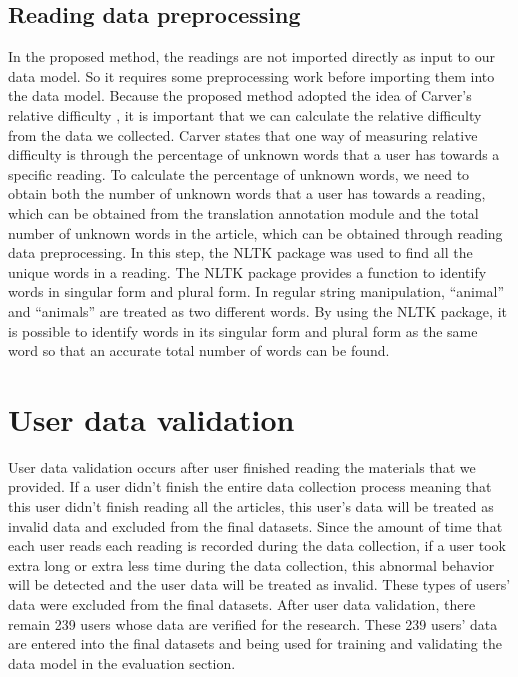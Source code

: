 \subsection{Reading data preprocessing}
\vspace{10pt}
In the proposed method, the readings are not imported directly as input to our data model. So it requires some preprocessing work before importing them into the data model. Because the proposed method adopted the idea of Carver's relative difficulty \cite{Carver1994}, it is important that we can calculate the relative difficulty from the data we collected. Carver states that one way of measuring relative difficulty is through the percentage of unknown words that a user has towards a specific reading. To calculate the percentage of unknown words, we need to obtain both the number of unknown words that a user has towards a reading, which can be obtained from the translation annotation module and the total number of unknown words in the article, which can be obtained through reading data preprocessing. In this step, the NLTK package was used to find all the unique words in a reading. The NLTK package provides a function to identify words in singular form and plural form. In regular string manipulation, “animal” and “animals” are treated as two different words. By using the NLTK package, it is possible to identify words in its singular form and plural form as the same word so that an accurate total number of words can be found.

\section{User data validation}
User data validation occurs after user finished reading the materials that we provided. If a user didn't finish the entire data collection process meaning that this user didn't finish reading all the articles, this user's data will be treated as invalid data and excluded from the final datasets. Since the amount of time that each user reads each reading is recorded during the data collection, if a user took extra long or extra less time during the data collection, this abnormal behavior will be detected and the user data will be treated as invalid. These types of users' data were excluded from the final datasets. After user data validation, there remain 239 users whose data are verified for the research. These 239 users' data are entered into the final datasets and being used for training and validating the data model in the evaluation section.

